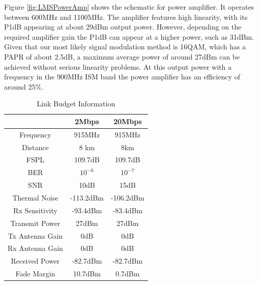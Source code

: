 \documentclass[crop=false]{standalone}
\begin{document}
        Figure \ref{fig:LMSPowerAmp} shows the schematic for power amplifier. It operates between 600MHz and 1100MHz. The amplifier features high linearity, with its P1dB appearing at about 29dBm output power. However, depending on the required amplifier gain the P1dB can appear at a higher power, such as 31dBm. Given that our most likely signal modulation method is 16QAM, which has a PAPR of about 2.5dB, a maximum average power of around 27dBm can be achieved without serious linearity problems. At this output power with a frequency in the 900MHz ISM band the power amplifier has an efficiency of around 25\%.
            
        \begin{table}
        \begin{tabular}{|c|c|c|}
        \hline
                        & 2Mbps                  & 20Mbps                 \\ \hline
        Frequency       & 915MHz                 & 915MHz                 \\ \hline
        Distance        & 8 km                   & 8km                    \\ \hline
        FSPL            & 109.7dB                & 109.7dB                \\ \hline
        BER             & \(10^{-6}\)            & \(10^{-7}\)            \\ \hline
        SNR             & 10dB                   & 15dB                   \\ \hline
        Thermal Noise   & -113.2dBm              & -106.2dBm              \\ \hline
        Rx Sensitivity  & -93.4dBm               & -83.4dBm               \\ \hline
        Transmit Power  & 27dBm                  & 27dBm                  \\ \hline
        Tx Antenna Gain & 0dB                    & 0dB                    \\ \hline
        Rx Antenna Gain & 0dB                    & 0dB                    \\ \hline
        Received Power  & -82.7dBm               & -82.7dBm               \\ \hline
        Fade Margin     & 10.7dBm                & 0.7dBm                 \\ \hline
        \end{tabular}
        \caption{Link Budget Information}
        \label{table:M2RBLink}
        \end{table}
        
\end{document}
